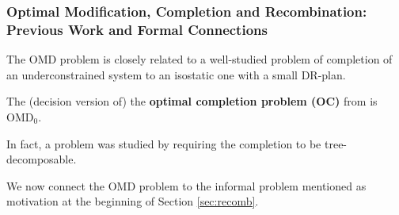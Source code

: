 %
\subsubsection{Optimal Modification, Completion and Recombination: Previous Work and Formal Connections}
%
The OMD problem is closely related to a well-studied problem of completion of an underconstrained system to an isostatic one with a small DR-plan.
\begin{observation}\label{obs:OC_to_OMD}
    The (decision version of) the \textbf{optimal completion problem (OC)} from \cite{sitharam2005combinatorial,joan-arinyo2003transforming,zhang-gao2006well} is OMD$_0$.
\end{observation}
In fact, a  problem was studied by \cite{joan-arinyo2003transforming} requiring the completion to be tree-decomposable.

We now connect the OMD problem to the informal  problem mentioned as motivation at the beginning of Section \ref{sec:recomb}.

